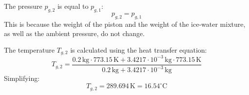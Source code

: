 The pressure \( p_{g,2} \) is equal to \( p_{g,1} \):  
\[
p_{g,2} = p_{g,1}
\]  
This is because the weight of the piston and the weight of the ice-water mixture, as well as the ambient pressure, do not change.  

The temperature \( T_{g,2} \) is calculated using the heat transfer equation:  
\[
T_{g,2} = \frac{0.2 \, \text{kg} \cdot 773.15 \, \text{K} + 3.4217 \cdot 10^{-3} \, \text{kg} \cdot 773.15 \, \text{K}}{0.2 \, \text{kg} + 3.4217 \cdot 10^{-3} \, \text{kg}}
\]  
Simplifying:  
\[
T_{g,2} = 289.694 \, \text{K} = 16.54^\circ\text{C}
\]